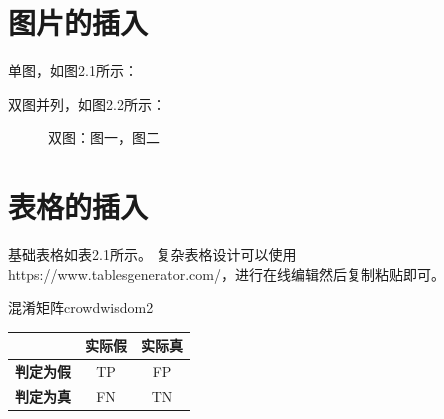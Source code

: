 \documentclass[a4paper,AutoFakeBold,oneside,12pt]{book}
\begin{document}
\section{图片的插入}
单图，如图2.1所示：

双图并列，如图2.2所示：

\begin{figure}[!htbp]
    \centering
    \quad %
    \caption{双图：\protect{}图一，\protect{}图二} %
    \label{Fig:spamclass} %
\end{figure}

\section{表格的插入}
基础表格如表2.1所示。
复杂表格设计可以使用https://www.tablesgenerator.com/，进行在线编辑然后复制粘贴即可。
\begin{xupttable}{混淆矩阵}{crowdwisdom2}
    \begin{tabular}{c|c|c}
        \hline \textbf{\ } & \textbf{实际假} & \textbf{实际真} \\
        \hline  \textbf{判定为假}& TP & FP \\
        \hline \textbf{判定为真} & FN & TN\\
        \hline
    \end{tabular}
\end{xupttable}
\end{document}
